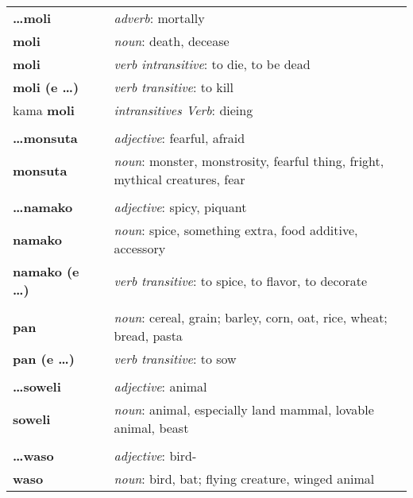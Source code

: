 \begin{supertabular}{p{2,5cm}|ll}
\textbf{\dots moli} && \textit{adverb}: mortally \\ %
\textbf{moli} && \textit{noun}: death, decease \\ %
\textbf{moli} && \textit{verb intransitive}: to die, to be dead \\ %
\textbf{moli (e \dots)} && \textit{verb transitive}: to kill \\ %
kama \textbf{moli} && \textit{intransitives Verb}: dieing \\ %
 && \\ %
%
\textbf{\dots monsuta} && \textit{adjective}: fearful, afraid \\ %
\textbf{monsuta} && \textit{noun}: monster, monstrosity, fearful thing, fright, mythical creatures, fear \\ %
 && \\ %
%
\textbf{\dots namako} && \textit{adjective}: spicy, piquant \\ 
\textbf{namako} && \textit{noun}: spice, something extra, food additive, accessory \\ %
\textbf{namako (e \dots)} && \textit{verb transitive}: to spice, to flavor, to decorate \\ %
 && \\ %
%
\textbf{pan} && \textit{noun}: cereal, grain; barley, corn, oat, rice, wheat; bread, pasta \\ %
\textbf{pan (e \dots)} && \textit{verb transitive}: to sow \\ %
 && \\ %
%
\textbf{\dots soweli} && \textit{adjective}: animal \\ %
\textbf{soweli} && \textit{noun}: animal, especially land mammal, lovable animal, beast \\ %
 && \\ %
%
\textbf{\dots waso} && \textit{adjective}: bird- \\ %
\textbf{waso} && \textit{noun}: bird, bat; flying creature, winged animal \\ %
%
\end{supertabular} \\
%
%
%
\newpage
%
